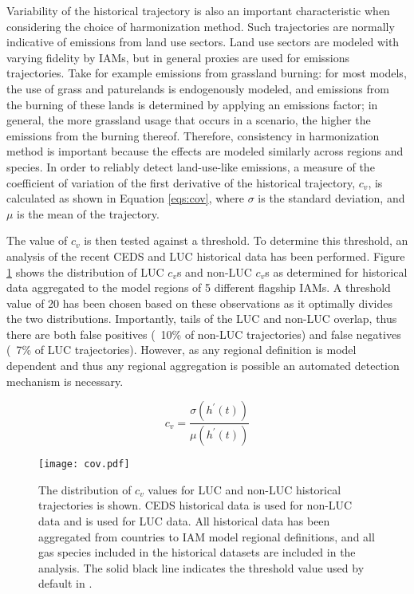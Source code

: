 Variability of the historical trajectory is also an important characteristic
when considering the choice of harmonization method. Such trajectories are
normally indicative of emissions from land use sectors. Land use sectors are
modeled with varying fidelity by IAMs, but in general proxies are used for
emissions trajectories. Take for example emissions from grassland burning: for
most models, the use of grass and paturelands is endogenously modeled, and
emissions from the burning of these lands is determined by applying an emissions
factor; in general, the more grassland usage that occurs in a scenario, the
higher the emissions from the burning thereof. Therefore, consistency in
harmonization method is important because the effects are modeled similarly
across regions and species. In order to reliably detect land-use-like emissions,
a measure of the coefficient of variation of the first derivative of the
historical trajectory, $c_v$, is calculated as shown in Equation \ref{eqs:cov},
where $\sigma$ is the standard deviation, and $\mu$ is the mean of the
trajectory.

The value of $c_v$ is then tested against a threshold. To determine this
threshold, an analysis of the recent CEDS and LUC historical data has been
performed. Figure \ref{fig:cov} shows the distribution of LUC $c_v$s and non-LUC
$c_v$s as determined for historical data aggregated to the model regions of 5
different flagship IAMs. A threshold value of 20 has been chosen based on these
observations as it optimally divides the two distributions. Importantly, tails
of the LUC and non-LUC overlap, thus there are both false positives (~10\% of
non-LUC trajectories) and false negatives (~7\% of LUC trajectories). However,
as any regional definition is model dependent and thus any regional aggregation
is possible an automated detection mechanism is necessary.

\begin{equation}\label{eqs:cov}
    c_v =  \frac{\sigma(h^{\prime}(t))}{\mu(h^{\prime}(t))}
\end{equation}


\begin{figure}
  \begin{center}
    \texttt{[image: cov.pdf]}
    \caption[]{
      \label{fig:cov}
      The distribution of $c_v$ values for LUC and non-LUC historical
      trajectories is shown. CEDS historical data \cite{hoesly_historical_2017}
      is used for non-LUC data and \cite{van_marle_historic_2017} is used for
      LUC data. All historical data has been aggregated from countries to IAM
      model regional definitions, and all gas species included in the historical
      datasets are included in the analysis. The solid black line indicates the
      threshold value used by default in .  }
  \end{center}
\end{figure}

